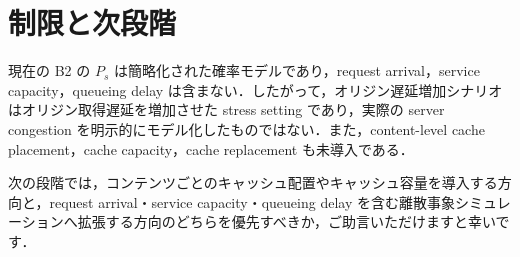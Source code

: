 \documentclass[paper=a4,fontsize=8pt,twocolumn]{jlreq}
\begin{document}
\section{制限と次段階}
現在の B2 の $P_s$ は簡略化された確率モデルであり，request arrival，service capacity，queueing delay は含まない．したがって，オリジン遅延増加シナリオはオリジン取得遅延を増加させた stress setting であり，実際の server congestion を明示的にモデル化したものではない．また，content-level cache placement，cache capacity，cache replacement も未導入である．

次の段階では，コンテンツごとのキャッシュ配置やキャッシュ容量を導入する方向と，request arrival・service capacity・queueing delay を含む離散事象シミュレーションへ拡張する方向のどちらを優先すべきか，ご助言いただけますと幸いです．
\end{document}
